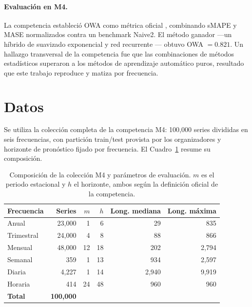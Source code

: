 \paragraph{Evaluación en M4.} La competencia estableció OWA como métrica oficial
\cite{makridakis2020}, combinando sMAPE y MASE normalizados contra un benchmark
Naive2. El método ganador ---un híbrido de suavizado exponencial y red recurrente
\cite{smyl2020}--- obtuvo OWA $=0.821$. Un hallazgo transversal de la competencia
fue que las combinaciones de métodos estadísticos superaron a los métodos de
aprendizaje automático puros, resultado que este trabajo reproduce y matiza por
frecuencia.


\section{Datos}\label{sec:datos}

Se utiliza la colección completa de la competencia M4: 100{,}000 series divididas
en seis frecuencias, con partición train/test provista por los organizadores y
horizonte de pronóstico fijado por frecuencia. El Cuadro~\ref{tab:datos} resume su
composición.

\begin{table}[htbp]
\centering
\caption{Composición de la colección M4 y parámetros de evaluación.
$m$ es el periodo estacional y $h$ el horizonte, ambos según la definición oficial
de la competencia.}
\label{tab:datos}
\begin{tabular}{lrrrrr}
\toprule
\textbf{Frecuencia} & \textbf{Series} & \textbf{$m$} & \textbf{$h$}
                    & \textbf{Long. mediana} & \textbf{Long. máxima} \\
\midrule
Anual       & 23{,}000 & 1  & 6  & 29    & 835 \\
Trimestral  & 24{,}000 & 4  & 8  & 88    & 866 \\
Mensual     & 48{,}000 & 12 & 18 & 202   & 2{,}794 \\
Semanal     & 359      & 1  & 13 & 934   & 2{,}597 \\
Diaria      & 4{,}227  & 1  & 14 & 2{,}940 & 9{,}919 \\
Horaria     & 414      & 24 & 48 & 960   & 960 \\
\midrule
\textbf{Total} & \textbf{100{,}000} & & & & \\
\bottomrule
\end{tabular}
\end{table}

